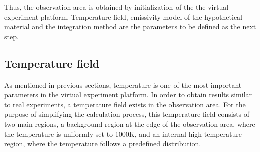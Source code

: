 Thus, the observation area is obtained by initialization of the the virtual 
experiment platform. Temperature field, emissivity model of the hypothetical 
material and the integration method are the parameters to be defined as the next
step.


\subsection{Temperature field}%
As mentioned in previous sections, temperature is one of the most important parameters 
in the virtual experiment platform. In order to obtain results similar to real 
experiments, a temperature field exists in the observation area. For the purpose of 
simplifying the calculation process, this temperature field consists of two main 
regions, a background region at the edge of the observation area, 
where the temperature is uniformly set to 1000K, and an internal high temperature 
region, where the temperature follows a predefined distribution.


